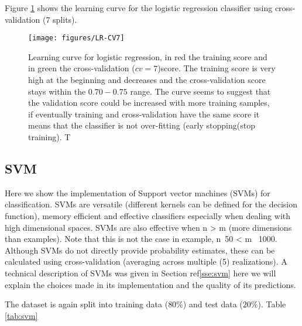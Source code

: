 \documentclass[11pt]{article}
\begin{document}
Figure \ref{fig:lr-cv7} shows the learning curve for the logistic regression classifier using cross-validation (7 splits).
\begin{figure}[H]
        \centering
        \texttt{[image: figures/LR-CV7]}
        \caption{Learning curve for logistic regression, in red the training score and in green the cross-validation ($cv=7$)score. The training score is very high at the beginning and decreases and the cross-validation score stays within the $0.70-0.75$ range. The curve seems to suggest that the validation score could be increased with more training samples, if eventually training and cross-validation have the same score it means that the classifier is not over-fitting (early stopping(stop training). T
        }
\label{fig:lr-cv7}
\end{figure}


\subsection{SVM}
\label{se:ressvm}
Here we show the implementation of Support vector machines (SVMs) for classification. SVMs are versatile (different kernels can be defined for the decision function), memory efficient and effective classifiers especially when dealing with high dimensional spaces. SVMs are also effective when n > m (more dimensions than examples). Note that this is not the case in example, n~50 < m ~1000.
Although SVMs do not directly provide probability estimates, these can be calculated using cross-validation (averaging across multiple (5) realizations).
A technical description of SVMs was given in Section ref\ref{sse:svm} here we will explain the choices made in its implementation and the quality of its predictions.

The dataset is again split into training data ($80\%$) and test data ($20\%$). Table \ref{tab:svm}
\end{document}
